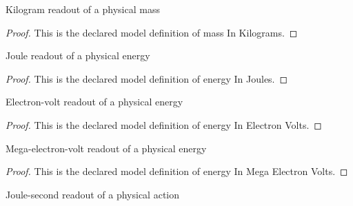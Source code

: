 \begin{definition}
  \label{def:physics:phyx-mini-0615:phyxminiproblems-problemphyxmini0615-massinkilograms}
  Kilogram readout of a physical mass
\end{definition}
\begin{proof}
  This is the declared model definition of mass In Kilograms.
\end{proof}
\begin{definition}
  \label{def:physics:phyx-mini-0615:phyxminiproblems-problemphyxmini0615-energyinjoules}
  Joule readout of a physical energy
\end{definition}
\begin{proof}
  This is the declared model definition of energy In Joules.
\end{proof}
\begin{definition}
  \label{def:physics:phyx-mini-0615:phyxminiproblems-problemphyxmini0615-energyinelectronvolts}
  Electron-volt readout of a physical energy
\end{definition}
\begin{proof}
  This is the declared model definition of energy In Electron Volts.
\end{proof}
\begin{definition}
  \label{def:physics:phyx-mini-0615:phyxminiproblems-problemphyxmini0615-energyinmegaelectronvolts}
  Mega-electron-volt readout of a physical energy
\end{definition}
\begin{proof}
  This is the declared model definition of energy In Mega Electron Volts.
\end{proof}
\begin{definition}
  \label{def:physics:phyx-mini-0615:phyxminiproblems-problemphyxmini0615-actioninjouleseconds}
  Joule-second readout of a physical action
\end{definition}
